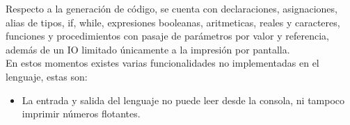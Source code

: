 \documentclass[12pt, spanish]{report}
\begin{document}
\indent Respecto a la generaci\'on de c\'odigo, se cuenta con
declaraciones, asignaciones, alias de tipos, if, while, expresiones
booleanas, aritmeticas, reales y caracteres, funciones y
procedimientos con pasaje de parámetros por valor y referencia,
adem\'as de un IO limitado únicamente a la impresión por pantalla.\\

\indent En estos momentos existes varias funcionalidades no
implementadas en el lenguaje, estas son:
\begin{itemize}
\item La entrada y salida del lenguaje no puede leer desde la consola,
  ni tampoco imprimir números flotantes.
\end{itemize}



\end{document}
